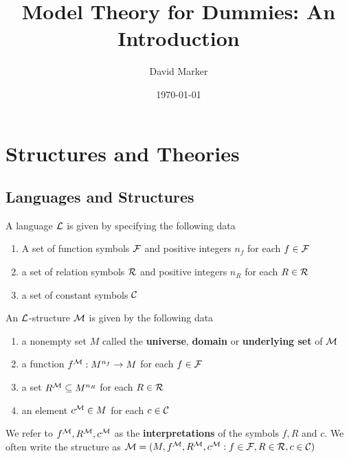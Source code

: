\documentclass[11pt]{article}
\author{David Marker}
\date{\today}
\title{Model Theory for Dummies: An Introduction}
\begin{document}
\maketitle
\tableofcontents



\section{Structures and Theories}
\label{sec:org633655d}
\subsection{Languages and Structures}
\label{sec:org74a1720}
\begin{definition}[]
A language \(\mathcal{L}\) is given by specifying the following data
\begin{enumerate}
\item A set of function symbols \(\mathcal{F}\) and positive integers \(n_f\) for each
\(f\in\mathcal{F}\)
\item a set of relation symbols \(\mathcal{R}\) and positive integers \(n_R\) for each
\(R\in\mathcal{R}\)
\item a set of constant symbols \(\mathcal{C}\)
\end{enumerate}
\end{definition}

\begin{definition}[]
An \(\mathcal{L}\)-structure \(\mathcal{M}\) is given by the following data
\begin{enumerate}
\item a nonempty set \(M\) called the \textbf{universe}, \textbf{domain} or \textbf{underlying set}
of \(\mathcal{M}\)
\item a function \(f^{\mathcal{M}}:M^{n_f}\to M\) for each \(f\in\mathcal{F}\)
\item a set \(R^{\mathcal{M}}\subseteq M^{n_R}\) for each \(R\in\mathcal{R}\)
\item an element \(c^{\mathcal{M}}\in M\) for each \(c\in\mathcal{C}\)
\end{enumerate}
\end{definition}

We refer to \(f^{\mathcal{M}},R^{\mathcal{M}},c^{\mathcal{M}}\) as the \textbf{interpretations} of the
symbols \(f,R\) and \(c\). We often write the structure as
\(\mathcal{M}=(M,f^{\mathcal{M}},R^{\mathcal{M}},c^{\mathcal{M}}:f\in\mathcal{F},R\in\mathcal{R},c\in\mathcal{C})\)
\end{document}
